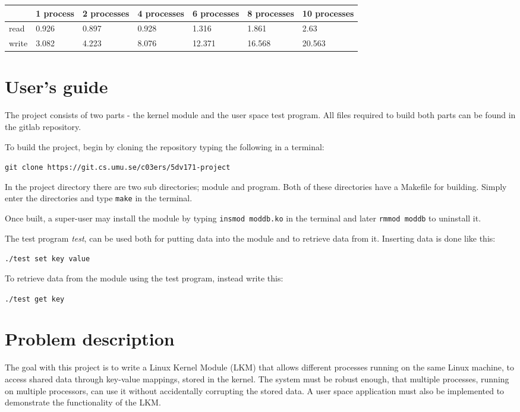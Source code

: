 \documentclass[final,a4paper]{article}
\newcommand{\codebase}{https://git.cs.umu.se/c03ers/5dv171-project}
\begin{document}
\begin{tabular}{|l|l|l|l|l|l|l|}
  \hline
  & 1 process & 2 processes & 4 processes & 6 processes & 8 processes
  & 10 processes \\
  \hline
  read & 0.926 & 0.897 & 0.928 & 1.316 & 1.861 & 2.63 \\
  \hline
  write & 3.082 & 4.223 & 8.076 & 12.371 & 16.568 & 20.563 \\
  \hline
\end{tabular}

\section*{User's guide}
The project consists of two parts - the kernel module and the user space
test program. All files required to build both parts can be found in the gitlab
repository.

To build the project, begin by cloning the repository typing the following in
a terminal:
\begin{center}
{\tt git clone \codebase}
\end{center}
In the project directory there are two sub directories; module and program.
Both of these directories have a Makefile for building. Simply enter the
directories and type {\tt make} in the terminal.

Once built, a super-user may install the module by typing 
{\tt insmod moddb.ko} in the terminal and later {\tt rmmod moddb}
to uninstall it.

The test program \emph{test}, can be used both for putting data
into the module and to retrieve data from it. Inserting data is done like this:
\begin{center}
{\tt ./test set key value}
\end{center}
To retrieve data from the module using the test program, instead write this:
\begin{center}
{\tt ./test get key}
\end{center}

\section*{Problem description}
The goal with this project is to write a Linux Kernel Module (LKM) that allows
different processes running on the same Linux machine, to access shared data
through key-value mappings, stored in the kernel. The system must be robust
enough, that multiple processes, running on multiple processors, can use it
without accidentally corrupting the stored data. A user space application must
also be implemented to demonstrate the functionality of the LKM.
\end{document}

